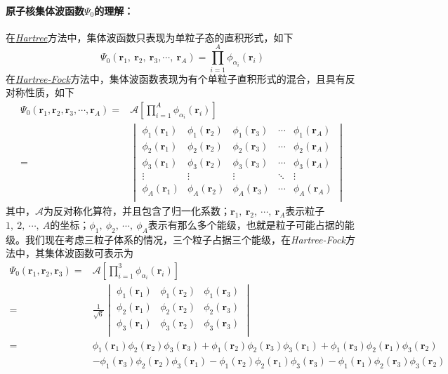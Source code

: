 \paragraph*{原子核集体波函数$\Psi_0$的理解：}在\uline{\textsl{Hartree}}方法中，集体波函数只表现为单粒子态的直积形式，如下
\begin{equation}
	\Psi_0(\bm{r}_1,\ \bm{r}_2,\ \bm{r}_3,\cdots,\ \bm{r}_A) = \prod_{i=1}^{A} \phi_{\alpha_i}(\bm{r}_i)
\end{equation} 
在\uline{\textsl{Hartree-Fock}}方法中，集体波函数表现为有个单粒子直积形式的混合，且具有反对称性质，如下
\begin{equation}
    \begin{aligned}
		\Psi_0(\bm{r}_1, \bm{r}_2, \bm{r}_3, \cdots, \bm{r}_A) ={}& \mathcal{A}\left[ \prod_{i=1}^{A} \phi_{\alpha_i}(\bm{r}_i) \right]	\\
		={}& 
		\begin{vmatrix}
			\phi_1(\bm{r}_1)	&	\phi_1(\bm{r}_2)	&	\phi_1(\bm{r}_3)	&	\cdots	&	\phi_1(\bm{r}_A)	\\
			\phi_2(\bm{r}_1)	&	\phi_2(\bm{r}_2)	&	\phi_2(\bm{r}_3)	&	\cdots	&	\phi_2(\bm{r}_A)	\\
			\phi_3(\bm{r}_1)	&	\phi_3(\bm{r}_2)	&	\phi_3(\bm{r}_3)	&	\cdots	&	\phi_3(\bm{r}_A)	\\
			\vdots				&	\vdots				&	\vdots				&	\ddots	&	\vdots				\\
			\phi_A(\bm{r}_1)	&	\phi_A(\bm{r}_2)	&	\phi_A(\bm{r}_3)	&	\cdots	&	\phi_A(\bm{r}_A)	\\
		\end{vmatrix}
    \end{aligned}
\end{equation} 
	其中，$\mathcal{A}$为反对称化算符，并且包含了归一化系数；$\bm{r}_1,\ \bm{r}_2,\ \cdots,\ \bm{r}_A$表示粒子$1,\ 2,\ \cdots,\ A$的坐标；$\phi_1,\ \phi_2,\ \cdots,\ \phi_A$表示有那么多个能级，也就是粒子可能占据的能级。我们现在考虑三粒子体系的情况，三个粒子占据三个能级，在\textsl{Hartree-Fock}方法中，其集体波函数可表示为
\begin{equation}
    \begin{aligned}
		\Psi_0(\bm{r}_1, \bm{r}_2, \bm{r}_3) ={}& \mathcal{A}\left[ \prod_{i=1}^{3} \phi_{\alpha_i}(\bm{r}_i) \right]	\\
		={}& \frac{1}{\sqrt{6}} 
		\begin{vmatrix}
			\phi_1(\bm{r}_1)	&	\phi_1(\bm{r}_2)	&	\phi_1(\bm{r}_3)	\\
			\phi_2(\bm{r}_1)	&	\phi_2(\bm{r}_2)	&	\phi_2(\bm{r}_3)	\\
			\phi_3(\bm{r}_1)	&	\phi_3(\bm{r}_2)	&	\phi_3(\bm{r}_3)	\\
		\end{vmatrix}	\\
		={}& \phi_1(\bm{r}_1)\phi_2(\bm{r}_2)\phi_3(\bm{r}_3) + \phi_1(\bm{r}_2)\phi_2(\bm{r}_3)\phi_3(\bm{r}_1) + \phi_1(\bm{r}_3)\phi_2(\bm{r}_1)\phi_3(\bm{r}_2) \\
		&- \phi_1(\bm{r}_3)\phi_2(\bm{r}_2)\phi_3(\bm{r}_1) - \phi_1(\bm{r}_2)\phi_2(\bm{r}_1)\phi_3(\bm{r}_3) - \phi_1(\bm{r}_1)\phi_2(\bm{r}_3)\phi_3(\bm{r}_2) 
    \end{aligned}
\end{equation} 
